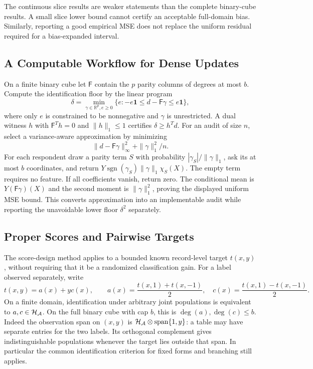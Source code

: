 

The continuous slice results are weaker statements than the complete
binary-cube results. A small slice lower bound cannot certify an acceptable
full-domain bias. Similarly, reporting a good empirical MSE does not
replace the uniform residual required for a bias-expanded interval.

\subsection{A Computable Workflow for Dense Updates}\label{app:dense}
On a finite binary cube let $\mathsf F$ contain the $p$ parity columns of degrees at most $b$. Compute the identification floor by the linear program
\[
 \delta=\min_{\gamma\in\mathbb R^p,e\ge0}\{e:-e\mathbf1\le d-\mathsf F\gamma\le e\mathbf1\},
\]
where only $e$ is constrained to be nonnegative and $\gamma$ is unrestricted. A dual witness $h$ with $\mathsf F^Th=0$ and $\|h\|_1\le1$ certifies $\delta\ge h^Td$. For an audit of size $n$, select a variance-aware approximation by minimizing
\[
 \|d-\mathsf F\gamma\|_\infty^2+\|\gamma\|_1^2/n.
\]
For each respondent draw a parity term $S$ with probability $|\gamma_S|/\|\gamma\|_1$, ask its at most $b$ coordinates, and return $Y\operatorname{sgn}(\gamma_S)\|\gamma\|_1\chi_S(X)$. The empty term requires no feature. If all coefficients vanish, return zero. The conditional mean is $Y(\mathsf F\gamma)(X)$ and the second moment is $\|\gamma\|_1^2$, proving the displayed uniform MSE bound. This converts approximation into an implementable audit while reporting the unavoidable lower floor $\delta^2$ separately.

\subsection{Proper Scores and Pairwise Targets}\label{app:metrics}
The score-design method applies to a bounded known record-level target
$t(x,y)$, without requiring that it be a randomized classification gain.
For a label observed separately, write
\[
 t(x,y)=a(x)+yc(x),\qquad
 a(x)=\frac{t(x,1)+t(x,-1)}2,\quad
 c(x)=\frac{t(x,1)-t(x,-1)}2.
\]
On a finite domain, identification under arbitrary joint populations is
equivalent to $a,c\in\mathcal H_\mathcal A$. On the full binary cube with cap $b$, this is
$\deg(a),\deg(c)\le b$. Indeed the observation span on $(x,y)$ is
$\mathcal H_\mathcal A\otimes\operatorname{span}\{1,y\}$: a table may have separate
entries for the two labels. Its orthogonal complement gives indistinguishable
populations whenever the target lies outside that span. In particular the
common identification criterion for fixed forms and branching still applies.

